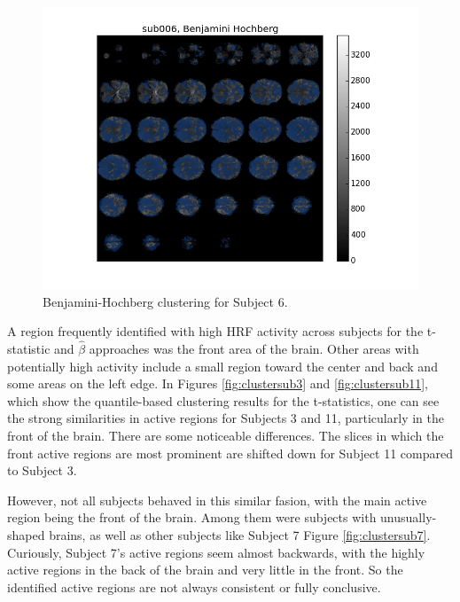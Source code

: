 \begin{figure}[ht]
\begin{minipage}[b]{.4\linewidth}
	\centering
		\includegraphics[width=.8\linewidth]{../images/sub006_bh_overlay.png} 
	\caption{Benjamini-Hochberg clustering for Subject 6.}
	\label{fig:clusterBH}
\end{minipage}
\end{figure}

A region frequently identified with high HRF activity across subjects for the 
t-statistic and $\hat{\beta}$ approaches was the front area of the brain. 
Other areas with potentially high activity include a small region toward the 
center and back and some areas on the left edge. In Figures 
\ref{fig:clustersub3} and \ref{fig:clustersub11}, which show the 
quantile-based clustering results for the t-statistics, one can see the strong 
similarities in active regions for Subjects 3 and 11, particularly in the 
front of the brain. There are some noticeable differences. The slices in which 
the front active regions are most prominent are shifted down for Subject 11 
compared to Subject 3. 

However, not all subjects behaved in this similar fasion, with the main active 
region being the front of the brain. Among them were subjects with 
unusually-shaped brains, as well as other subjects like Subject 7 Figure 
\ref{fig:clustersub7}. Curiously, Subject 7's active regions seem almost 
backwards, with the highly active regions in the back of the brain and very 
little in the front. So the identified active regions are not always 
consistent or fully conclusive. 

